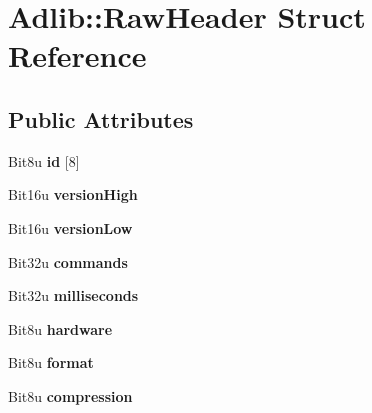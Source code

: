 \hypertarget{structAdlib_1_1RawHeader}{\section{Adlib\-:\-:Raw\-Header Struct Reference}
\label{structAdlib_1_1RawHeader}
}
\subsection*{Public Attributes}
\begin{DoxyCompactItemize}
\item 
\hypertarget{structAdlib_1_1RawHeader_ad9b9a35aa8fa691f2b2b70b535bad23b}{Bit8u {\bfseries id} \mbox{[}8\mbox{]}}\label{structAdlib_1_1RawHeader_ad9b9a35aa8fa691f2b2b70b535bad23b}

\item 
\hypertarget{structAdlib_1_1RawHeader_a536f6b6c59f8ed19f8249fd312e6e9bb}{Bit16u {\bfseries version\-High}}\label{structAdlib_1_1RawHeader_a536f6b6c59f8ed19f8249fd312e6e9bb}

\item 
\hypertarget{structAdlib_1_1RawHeader_ab957fd1198a6aa6272ae6b91e10a24f4}{Bit16u {\bfseries version\-Low}}\label{structAdlib_1_1RawHeader_ab957fd1198a6aa6272ae6b91e10a24f4}

\item 
\hypertarget{structAdlib_1_1RawHeader_a4be20c023ef2a097904e450924b45ee0}{Bit32u {\bfseries commands}}\label{structAdlib_1_1RawHeader_a4be20c023ef2a097904e450924b45ee0}

\item 
\hypertarget{structAdlib_1_1RawHeader_addd6e031f08c9d85d69641497789de3b}{Bit32u {\bfseries milliseconds}}\label{structAdlib_1_1RawHeader_addd6e031f08c9d85d69641497789de3b}

\item 
\hypertarget{structAdlib_1_1RawHeader_a2f4f47dcc7569bb1c969ca31b1695fc8}{Bit8u {\bfseries hardware}}\label{structAdlib_1_1RawHeader_a2f4f47dcc7569bb1c969ca31b1695fc8}

\item 
\hypertarget{structAdlib_1_1RawHeader_a4b308b0c18386d5a545e952b13a94898}{Bit8u {\bfseries format}}\label{structAdlib_1_1RawHeader_a4b308b0c18386d5a545e952b13a94898}

\item 
\hypertarget{structAdlib_1_1RawHeader_a26957b8fefe22149989d4188aeb732c0}{Bit8u {\bfseries compression}}\label{structAdlib_1_1RawHeader_a26957b8fefe22149989d4188aeb732c0}


\end{DoxyCompactItemize}
